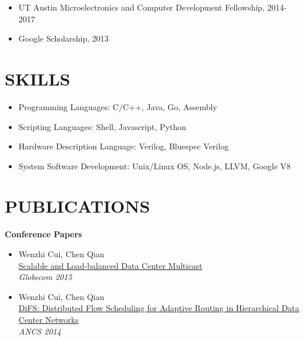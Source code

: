 \documentclass[margin, 9pt]{res} %
\begin{document}
\begin{resume}
\vspace*{-1pt}
\begin{itemize}[leftmargin=*] \itemsep -4pt
	\item UT Austin Microelectronics and Computer Development Fellowship, 2014-2017
	\item Google Scholarship, 2013
\end{itemize}

 
\section{SKILLS}

\vspace*{-1pt}
\begin{itemize}[leftmargin=*] \itemsep -4pt
	\item Programming Languages: C/C++, Java, Go, Assembly
	\item Scripting Languages: Shell, Javascript, Python
	\item Hardware Description Language: Verilog, Bluespec Verilog
	\item System Software Development: Unix/Linux OS, Node.js, LLVM, Google V8
\end{itemize}

 
\section{PUBLICATIONS}

{\large\textbf{Conference Papers}}

\begin{itemize}[leftmargin=*] \itemsep 0pt
	\item Wenzhi Cui, Chen Qian\\
          \href{http://arxiv.org/pdf/1403.8065.pdf}{Scalable and Load-balanced Data Center Multicast}\\
          \textit{Globecom 2015}

	\item Wenzhi Cui, Chen Qian\\
          \href{http://www.cs.uky.edu/~qian/papers/DiFS.pdf}{DiFS: Distributed Flow Scheduling for Adaptive Routing in Hierarchical Data Center Networks}\\
          \textit{ANCS 2014}
\end{itemize}


\end{resume}
\end{document}
